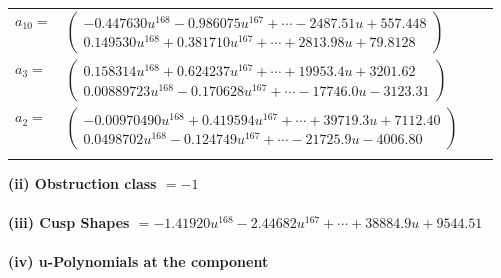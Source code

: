 \documentclass[1p]{elsarticle_modified}
\theoremstyle{definition}
\begin{document}
\begin{tabular}{m{7pt} m{180pt} m{7pt} m{180pt} }
\flushright $a_{10}=$&$\begin{pmatrix}-0.447630 u^{168}-0.986075 u^{167}+\cdots-2487.51 u+557.448\\0.149530 u^{168}+0.381710 u^{167}+\cdots+2813.98 u+79.8128\end{pmatrix}$ \\
\flushright $a_{3}=$&$\begin{pmatrix}0.158314 u^{168}+0.624237 u^{167}+\cdots+19953.4 u+3201.62\\0.00889723 u^{168}-0.170628 u^{167}+\cdots-17746.0 u-3123.31\end{pmatrix}$ \\
\flushright $a_{2}=$&$\begin{pmatrix}-0.00970490 u^{168}+0.419594 u^{167}+\cdots+39719.3 u+7112.40\\0.0498702 u^{168}-0.124749 u^{167}+\cdots-21725.9 u-4006.80\end{pmatrix}$\\&\end{tabular}
\flushleft \textbf{(ii) Obstruction class $= -1$}\\~\\
\flushleft \textbf{(iii) Cusp Shapes $= -1.41920 u^{168}-2.44682 u^{167}+\cdots+38884.9 u+9544.51$}\\~\\
\newpage\renewcommand{\arraystretch}{1}
\flushleft \textbf{(iv) u-Polynomials at the component}\newline \\
\end{document}
